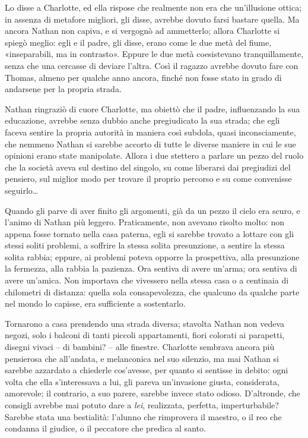 Lo disse a Charlotte, ed ella rispose che realmente non era che un'illusione ottica; in assenza di
metafore migliori, gli disse, avrebbe dovuto farsi bastare quella. Ma ancora Nathan non capiva, e si
vergognò ad ammetterlo; allora Charlotte si spiegò meglio: egli e il padre, gli disse, erano come le
due metà del fiume, «inseparabili, ma in contrasto». Eppure le due metà coesistevano
tranquillamente, senza che una cercasse di deviare l'altra. Così il ragazzo avrebbe dovuto fare con
Thomas, almeno per qualche anno ancora, finché non fosse stato in grado di andarsene per la propria
strada.

Nathan ringraziò di cuore Charlotte, ma obiettò che il padre, influenzando la sua educazione,
avrebbe senza dubbio anche pregiudicato la sua strada; che egli faceva sentire la propria autorità
in maniera così subdola, quasi inconsciamente, che nemmeno Nathan si sarebbe accorto di tutte le
diverse maniere in cui le sue opinioni erano state manipolate. Allora i due stettero a parlare un
pezzo del ruolo che la società aveva sul destino del singolo, su come liberarsi dai pregiudizi del
pensiero, sul miglior modo per trovare il proprio percorso e su come convenisse seguirlo\dots

Quando gli parve di aver finito gli argomenti, già da un pezzo il cielo era scuro, e l'animo di
Nathan più leggero. Praticamente, non avevano risolto molto: non appena fosse tornato nella casa
paterna, egli si sarebbe trovato a lottare con gli stessi soliti problemi, a soffrire la stessa
solita presunzione, a sentire la stessa solita rabbia; eppure, ai problemi poteva opporre la
prospettiva, alla presunzione la fermezza, alla rabbia la pazienza. Ora sentiva di avere un'arma;
ora sentiva di avere un'amica. Non importava che vivessero nella stessa casa o a centinaia di
chilometri di distanza: quella sola consapevolezza, che qualcuno da qualche parte nel mondo lo
capisse, era sufficiente a sostentarlo.

Tornarono a casa prendendo una strada diversa; stavolta Nathan non vedeva negozi, solo i balconi di
tanti piccoli appartamenti, fiori colorati ai parapetti, disegni vivaci -- di bambini? -- alle
finestre. Charlotte sembrava ancora più pensierosa che all'andata, e melanconica nel suo silenzio,
ma mai Nathan si sarebbe azzardato a chiederle cos'avesse, per quanto si sentisse in debito: ogni
volta che ella s'interessava a lui, gli pareva un'invasione giusta, considerata, amorevole; il
contrario, a suo parere, sarebbe invece stato odioso. D'altronde, che consigli avrebbe mai potuto
dare a \emph{lei}, realizzata, perfetta, imperturbabile? Sarebbe stata una bestialità: l'alunno che
rimprovera il maestro, o il reo che condanna il giudice, o il peccatore che predica al santo.

